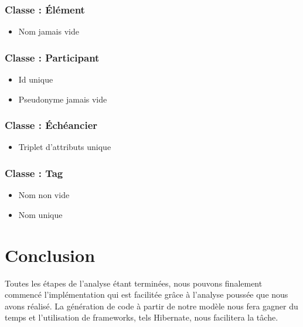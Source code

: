 \subsubsection*{Classe : Élément}
\begin{itemize}
\item Nom jamais vide
\end{itemize} 

\subsubsection*{Classe : Participant}
\begin{itemize}
\item Id unique
\item Pseudonyme jamais vide
\end{itemize} 

\subsubsection*{Classe : Échéancier}
\begin{itemize}
\item Triplet d'attributs unique
\end{itemize}

\subsubsection*{Classe : Tag}
\begin{itemize}
\item Nom non vide
\item Nom unique
\end{itemize}

\section*{Conclusion}
Toutes les étapes de l'analyse étant terminées, nous pouvons finalement commencé l'implémentation qui est facilitée grâce à l'analyse poussée que nous avons réalisé. La génération de code à partir de notre modèle nous fera gagner du temps et l'utilisation de frameworks, tels Hibernate, nous facilitera la tâche.